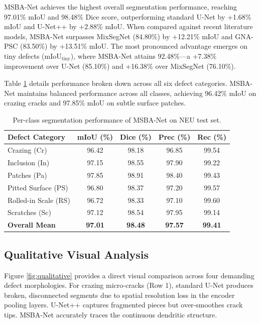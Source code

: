 \documentclass[10pt,a4paper]{article}
\begin{document}
MSBA-Net achieves the highest overall segmentation performance, reaching 97.01\% mIoU and 98.48\% Dice score, outperforming standard U-Net by +1.68\% mIoU and U-Net++ by +2.88\% mIoU. When compared against recent literature models, MSBA-Net surpasses MixSegNet (84.80\%) by +12.21\% mIoU and GNA-PSC (83.50\%) by +13.51\% mIoU. The most pronounced advantage emerges on tiny defects ($\text{mIoU}_{\text{tiny}}$), where MSBA-Net attains 92.48\%---a +7.38\% improvement over U-Net (85.10\%) and +16.38\% over MixSegNet (76.10\%).

Table \ref{tab:classwise} details performance broken down across all six defect categories. MSBA-Net maintains balanced performance across all classes, achieving 96.42\% mIoU on crazing cracks and 97.85\% mIoU on subtle surface patches.

\begin{table}[h]
  \centering
  \fontsize{8.5pt}{10.5pt}\selectfont
  \caption{Per-class segmentation performance of MSBA-Net on NEU test set.}
  \label{tab:classwise}
  \begin{tabular*}{\columnwidth}{@{\extracolsep{\fill}}lcccc@{}}
    \toprule
    Defect Category & mIoU (\%) & Dice (\%) & Prec (\%) & Rec (\%) \\
    \midrule
    Crazing (Cr) & 96.42 & 98.18 & 96.85 & 99.54 \\
    Inclusion (In) & 97.15 & 98.55 & 97.90 & 99.22 \\
    Patches (Pa) & 97.85 & 98.91 & 98.40 & 99.43 \\
    Pitted Surface (PS) & 96.80 & 98.37 & 97.20 & 99.57 \\
    Rolled-in Scale (RS) & 96.72 & 98.33 & 97.10 & 99.60 \\
    Scratches (Sc) & 97.12 & 98.54 & 97.95 & 99.14 \\
    \midrule
    \textbf{Overall Mean} & \textbf{97.01} & \textbf{98.48} & \textbf{97.57} & \textbf{99.41} \\
    \bottomrule
  \end{tabular*}
\end{table}

\subsection{Qualitative Visual Analysis}
Figure \ref{fig:qualitative} provides a direct visual comparison across four demanding defect morphologies. For crazing micro-cracks (Row 1), standard U-Net produces broken, disconnected segments due to spatial resolution loss in the encoder pooling layers. U-Net++ captures fragmented pieces but over-smoothes crack tips. MSBA-Net accurately traces the continuous dendritic structure.
\end{document}
